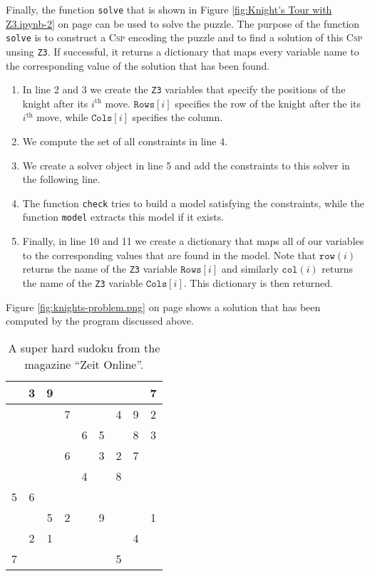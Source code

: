 Finally, the function \texttt{solve} that is shown in Figure \ref{fig:Knight's Tour with Z3.ipynb-2} on page
\pageref{fig:Knight's Tour with Z3.ipynb-2} can be used to solve the puzzle.
The purpose of the function \texttt{solve} is to construct a \textsc{Csp} encoding the puzzle and to find a
solution of this \textsc{Csp} unsing \texttt{Z3}.
If successful, it returns a dictionary that maps every variable name to the corresponding value of the solution
that has been found.
\begin{enumerate}
\item In line 2 and 3 we create the \texttt{Z3} variables that specify the positions of the knight after its
      $i^{\mathrm{th}}$ move.  $\texttt{Rows}[i]$ specifies the row of the knight after the its
      $i^{\mathrm{th}}$ move, while $\texttt{Cols}[i]$ specifies the column.
\item We compute the set of all constraints in line 4.   
\item We create a solver object in line 5 and add the constraints to this solver in the following line.
\item The function \texttt{check} tries to build a model satisfying the constraints, while the function
      \texttt{model} extracts this model if it exists.
\item Finally, in line 10 and 11 we create a dictionary that maps all of our variables to the corresponding
      values that are found in the model.  Note that $\texttt{row}(i)$ returns the name of the
      \texttt{Z3} variable $\texttt{Rows}[i]$ and similarly $\mathtt{col}(i)$ returns the name of the
      \texttt{Z3} variable $\texttt{Cols}[i]$.
      This dictionary is then returned.
\end{enumerate}
Figure \ref{fig:knights-problem.png} on page \pageref{fig:knights-problem.png} shows a solution that has been
computed by the program discussed above.


\begin{table}[h]
  \centering
  \begin{tabular}{||c|c|c||c|c|c||c|c|c||}
    \hline
    \hline
      & 3 & 9 &   &   &   &   &   & 7 \\
    \hline
      &   &   & 7 &   &   & 4 & 9 & 2 \\
    \hline
      &   &   &   & 6 & 5 &   & 8 & 3 \\
    \hline
    \hline
      &   &   & 6 &   & 3 & 2 & 7 &   \\
    \hline
      &   &   &   & 4 &   & 8 &   &   \\
    \hline
    5 & 6 &   &   &   &   &   &   &   \\
    \hline
    \hline
      &   & 5 & 2 &   & 9 &   &   & 1 \\
    \hline
      & 2 & 1 &   &   &   &   & 4 &   \\
    \hline
    7 &   &   &   &   &   & 5 &   &   \\
    \hline
    \hline
  \end{tabular}
  \caption{A super hard sudoku from the magazine ``Zeit Online''.}
  \label{tab:sudoku}
\end{table}


